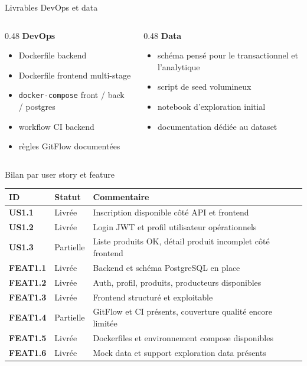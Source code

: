 \documentclass[10pt,aspectratio=169]{beamer}
\begin{document}
\begin{frame}{Livrables DevOps et data}
  \begin{columns}[T]
    \begin{column}{0.48\textwidth}
      \textbf{DevOps}
      \begin{itemize}
        \item Dockerfile backend
        \item Dockerfile frontend multi-stage
        \item \texttt{docker-compose} front / back / postgres
        \item workflow CI backend
        \item règles GitFlow documentées
      \end{itemize}
    \end{column}
    \begin{column}{0.48\textwidth}
      \textbf{Data}
      \begin{itemize}
        \item schéma pensé pour le transactionnel et l'analytique
        \item script de seed volumineux
        \item notebook d'exploration initial
        \item documentation dédiée au dataset
      \end{itemize}
    \end{column}
  \end{columns}
\end{frame}

\begin{frame}{Bilan par user story et feature}
  \small
  \begin{tabularx}{\textwidth}{>{\bfseries}l l X}
    \toprule
    ID & Statut & Commentaire \\
    \midrule
    US1.1 & Livrée & Inscription disponible côté API et frontend \\
    US1.2 & Livrée & Login JWT et profil utilisateur opérationnels \\
    US1.3 & Partielle & Liste produits OK, détail produit incomplet côté frontend \\
    FEAT1.1 & Livrée & Backend et schéma PostgreSQL en place \\
    FEAT1.2 & Livrée & Auth, profil, produits, producteurs disponibles \\
    FEAT1.3 & Livrée & Frontend structuré et exploitable \\
    FEAT1.4 & Partielle & GitFlow et CI présents, couverture qualité encore limitée \\
    FEAT1.5 & Livrée & Dockerfiles et environnement compose disponibles \\
    FEAT1.6 & Livrée & Mock data et support exploration data présents \\
    \bottomrule
  \end{tabularx}
\end{frame}
\end{document}
